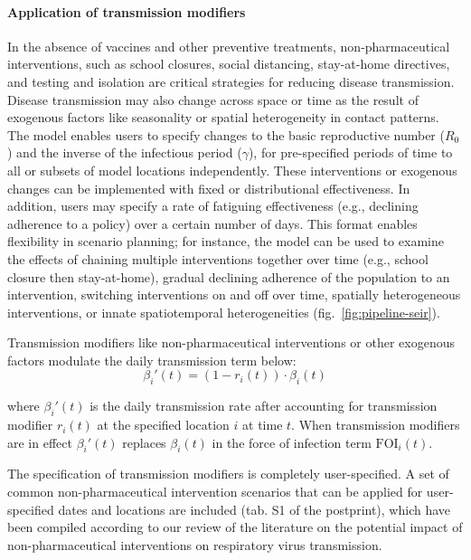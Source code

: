 {\paragraph{Application of transmission modifiers}
In the absence of vaccines and other preventive treatments, non-pharmaceutical interventions, such as school closures, social distancing, stay-at-home directives, and testing and isolation are critical strategies for reducing disease transmission. Disease transmission may also change across space or time as the result of exogenous factors like seasonality or spatial heterogeneity in contact patterns. The model enables users to specify changes to the basic reproductive number ($R_0$) and the inverse of the infectious period ($\gamma$), for pre-specified periods of time to all or subsets of model locations independently. These interventions or exogenous changes can be implemented with fixed or distributional effectiveness. In addition, users may specify a rate of fatiguing effectiveness (e.g., declining adherence to a policy) over a certain number of days. This format enables flexibility in scenario planning; for instance, the model can be used to examine the effects of chaining multiple interventions together over time (e.g., school closure then stay-at-home), gradual declining adherence of the population to an intervention, switching interventions on and off over time, spatially heterogeneous interventions, or innate spatiotemporal heterogeneities (fig.~\ref{fig:pipeline-seir}).

Transmission modifiers like non-pharmaceutical interventions or other exogenous factors modulate the daily transmission term below:
\begin{equation}
\beta _i'(t)=\left(1-r_i(t)\right)\cdot \beta_i (t)
\end{equation}

where $\beta_i'(t)$ is the daily transmission rate after accounting for transmission modifier $r_i(t)$ at the specified location $i$ at time $t$. When transmission modifiers are in effect $\beta_i'(t)$ replaces $\beta_i(t)$ in the force of infection term $\text{FOI}_i(t)$.


The specification of transmission modifiers is completely user-specified. A set of common non-pharmaceutical intervention scenarios that can be applied for user-specified dates and locations are included (tab. S1 of the postprint), which have been compiled according to our review of the literature on the potential impact of non-pharmaceutical interventions on respiratory virus transmission.

}
